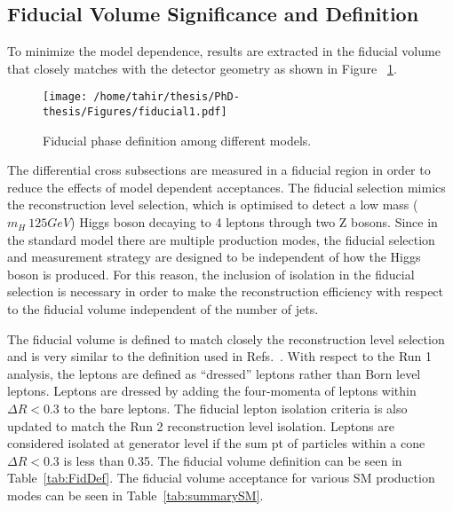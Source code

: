 
\subsection{Fiducial Volume Significance and Definition}
To minimize the model dependence, results are extracted in the fiducial volume that closely matches with the detector geometry as shown in Figure ~\ref{fig:Models_cartoon}. 
\begin{figure}[!h!tb]
 \begin{center}
    \texttt{[image: /home/tahir/thesis/PhD-thesis/Figures/fiducial1.pdf]}
    \caption{Fiducial phase definition among different models.}
 \label{fig:Models_cartoon}
 \end{center}
\end{figure}

The differential cross subsections are measured in a fiducial region in order to reduce the effects of model dependent acceptances. The fiducial selection mimics the
 reconstruction level selection, which is optimised to detect a low mass ($m_{H}~125 GeV$) Higgs boson decaying to 4 leptons through two Z bosons. Since in the standard model there are
 multiple production modes, the fiducial selection and measurement strategy are designed to
 be independent of how the Higgs boson is produced. For this reason, the inclusion of isolation
 in the fiducial selection is necessary in order to make the reconstruction efficiency with respect
to the fiducial volume independent of the number of jets.

The fiducial volume is defined to match closely the reconstruction level selection and is very similar to the definition
used in Refs.~\cite{CMSH4lFiducial8TeV}. With respect to the Run 1 analysis, 
the leptons are defined as ``dressed'' leptons rather than Born level leptons. 
Leptons are dressed by adding the four-momenta of leptons within $\Delta R<0.3$ to the bare leptons.  
The fiducial lepton isolation criteria is also updated to match the Run 2 reconstruction level isolation. Leptons are considered isolated at generator level if the sum pt of particles within a cone  $\Delta R<0.3$ is less than 0.35.
The fiducial volume definition can be seen in Table~\ref{tab:FidDef}. 
The fiducial volume acceptance for various SM production modes can be seen in Table~\ref{tab:summarySM}.

